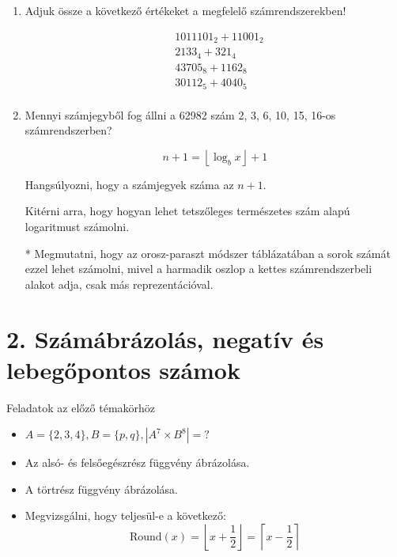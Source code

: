 \documentclass[a4paper]{article}
\newenvironment{comment}
{\color{Green}}{\bigskip}
\begin{document}
\begin{enumerate}
\item

Adjuk össze a következő értékeket a megfelelő számrendszerekben!

\begin{align*}
&1011101_{2} + 11001_{2} \\
&2133_{4} + 321_{4} \\
&43705_{8} + 1162_{8} \\
&30112_{5} + 4040_{5} \\
\end{align*}

\item

Mennyi számjegyből fog állni a 62982 szám 2, 3, 6, 10, 15, 16-os számrendszerben?

$$
n + 1 = \left\lfloor \log_b x \right\rfloor + 1
$$

\begin{comment}
Hangsúlyozni, hogy a számjegyek száma az $n + 1$.

Kitérni arra, hogy hogyan lehet tetszőleges természetes szám alapú logaritmust számolni.

* Megmutatni, hogy az orosz-paraszt módszer táblázatában a sorok számát ezzel lehet számolni, mivel a harmadik oszlop a kettes számrendszerbeli alakot adja, csak más reprezentációval.
\end{comment}

\end{enumerate}

\section*{2. Számábrázolás, negatív és lebegőpontos számok}

Feladatok az előző témakörhöz
\begin{itemize}
\item $A = \{2, 3, 4\}, B = \{p, q\}, |A^7 \times B^8| = ?$
\item Az alsó- és felsőegészrész függvény ábrázolása.
\item A törtrész függvény ábrázolása.
\item Megvizsgálni, hogy teljesül-e a következő:
$$
\text{Round}(x) =
\left\lfloor x + \dfrac{1}{2} \right\rfloor =
\left\lceil x - \dfrac{1}{2} \right\rceil
$$
\end{itemize}
\end{document}
